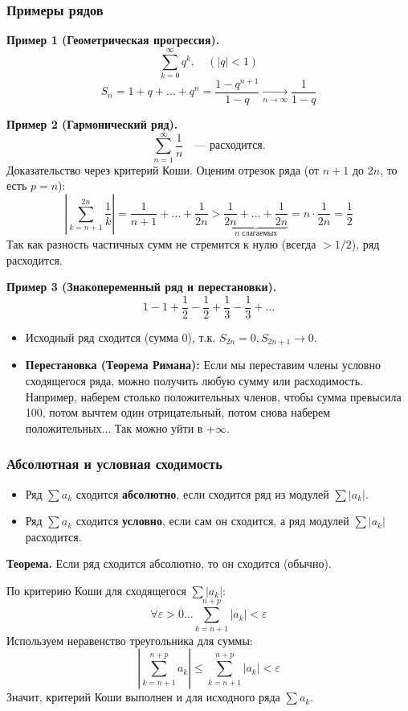 \subsubsection*{Примеры рядов}
\textbf{Пример 1 (Геометрическая прогрессия).}
\[ \sum_{k=0}^\infty q^k, \quad (|q| < 1) \]
\[ S_n = 1 + q + \dots + q^n = \frac{1-q^{n+1}}{1-q} \xrightarrow[n\to\infty]{} \frac{1}{1-q} \]

\textbf{Пример 2 (Гармонический ряд).}
\[ \sum_{n=1}^\infty \frac{1}{n} \quad \text{— расходится.} \]
Доказательство через критерий Коши. Оценим отрезок ряда (от $n+1$ до $2n$, то есть $p=n$):
\[ \left| \sum_{k=n+1}^{2n} \frac{1}{k} \right| = \frac{1}{n+1} + \dots + \frac{1}{2n} > \underbrace{\frac{1}{2n} + \dots + \frac{1}{2n}}_{n \text{ слагаемых}} = n \cdot \frac{1}{2n} = \frac{1}{2} \]
Так как разность частичных сумм не стремится к нулю (всегда $> 1/2$), ряд расходится.

\textbf{Пример 3 (Знакопеременный ряд и перестановки).}
\[ 1 - 1 + \frac{1}{2} - \frac{1}{2} + \frac{1}{3} - \frac{1}{3} + \dots \]
\begin{itemize}
    \item Исходный ряд сходится (сумма 0), т.к. $S_{2n} = 0, S_{2n+1} \to 0$.
    \item \textbf{Перестановка (Теорема Римана):} Если мы переставим члены условно сходящегося ряда, можно получить любую сумму или расходимость.
    Например, наберем столько положительных членов, чтобы сумма превысила 100, потом вычтем один отрицательный, потом снова наберем положительных... Так можно уйти в $+\infty$.
\end{itemize}

\subsubsection*{Абсолютная и условная сходимость}
\begin{tcolorbox}[title=Определения]
    \begin{itemize}
        \item Ряд $\sum a_k$ сходится \textbf{абсолютно}, если сходится ряд из модулей $\sum |a_k|$.
        \item Ряд $\sum a_k$ сходится \textbf{условно}, если сам он сходится, а ряд модулей $\sum |a_k|$ расходится.
    \end{itemize}
\end{tcolorbox}

\textbf{Теорема.} Если ряд сходится абсолютно, то он сходится (обычно).
\begin{tcolorbox}[title=Доказательство]
    По критерию Коши для сходящегося $\sum |a_k|$:
    \[ \forall \varepsilon > 0 \dots \sum_{k=n+1}^{n+p} |a_k| < \varepsilon \]
    Используем неравенство треугольника для суммы:
    \[ \left| \sum_{k=n+1}^{n+p} a_k \right| \leq \sum_{k=n+1}^{n+p} |a_k| < \varepsilon \]
    Значит, критерий Коши выполнен и для исходного ряда $\sum a_k$.
\end{tcolorbox}

